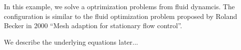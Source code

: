 In this example, we solve a optrimization problems from 
fluid dynamcis. The configuration is similar to 
the fluid optimization problem proposed by Roland Becker 
in 2000 ``Mesh adaption for stationary flow control''.

We describe the underlying equations later...
